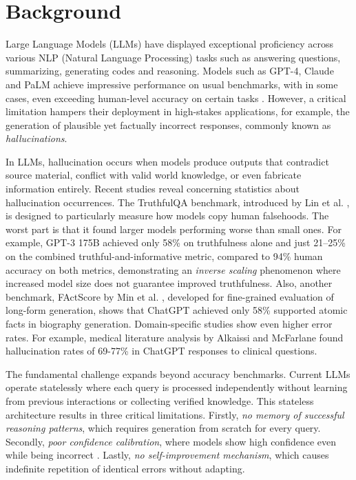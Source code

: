 \section{Background}

Large Language Models (LLMs) have displayed exceptional proficiency across various NLP (Natural Language Processing) tasks such as answering questions, summarizing, generating codes and reasoning. Models such as GPT-4, Claude and PaLM achieve impressive performance on usual benchmarks, with in some cases, even exceeding human-level accuracy on certain tasks \cite{openai2023gpt4, anthropic2023claude, anil2023palm}. However, a critical limitation hampers their deployment in high-stakes applications, for example, the generation of plausible yet factually incorrect responses, commonly known as \textit{hallucinations}.

In LLMs, hallucination occurs when models produce outputs that contradict source material, conflict with valid world knowledge, or even fabricate information entirely. Recent studies reveal concerning statistics about hallucination occurrences. The TruthfulQA benchmark, introduced by Lin et al. \cite{lin-etal-2022-truthfulqa}, is designed to particularly measure how models copy human falsehoods. The worst part is that it found larger models performing worse than small ones. For example, GPT-3 175B achieved only 58\% on truthfulness alone and just 21--25\% on the combined truthful-and-informative metric, compared to 94\% human accuracy on both metrics, demonstrating an \textit{inverse scaling} phenomenon where increased model size does not guarantee improved truthfulness. Also, another benchmark, FActScore by Min et al. \cite{min-etal-2023-factscore}, developed for fine-grained evaluation of long-form generation, shows that ChatGPT achieved only 58\% supported atomic facts in biography generation. Domain-specific studies show even higher error rates. For example, medical literature analysis by Alkaissi and McFarlane \cite{alkaissi2023artificial} found hallucination rates of 69-77\% in ChatGPT responses to clinical questions.

The fundamental challenge expands beyond accuracy benchmarks. Current LLMs operate statelessly where each query is processed independently without learning from previous interactions or collecting verified knowledge. This stateless architecture results in three critical limitations. Firstly, \textit{no memory of successful reasoning patterns}, which requires generation from scratch for every query. Secondly, \textit{poor confidence calibration}, where models show high confidence even while being incorrect \cite{kadavath2022language}. Lastly, \textit{no self-improvement mechanism}, which causes indefinite repetition of identical errors without adapting.

